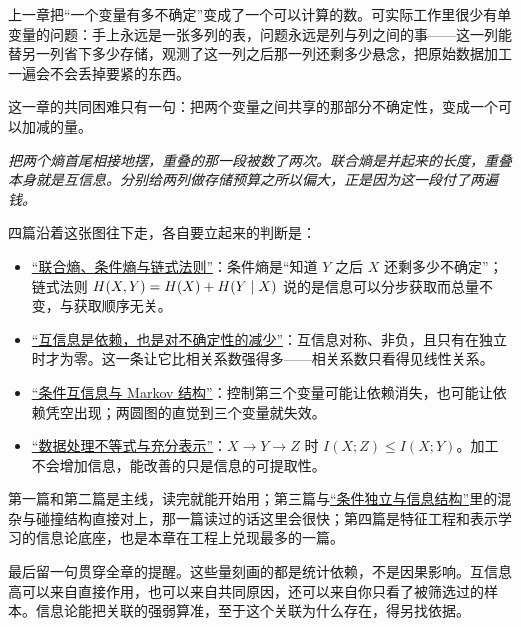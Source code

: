 上一章把``一个变量有多不确定''变成了一个可以计算的数。可实际工作里很少有单变量的问题：手上永远是一张多列的表，问题永远是列与列之间的事——这一列能替另一列省下多少存储，观测了这一列之后那一列还剩多少悬念，把原始数据加工一遍会不会丢掉要紧的东西。

这一章的共同困难只有一句：把两个变量之间共享的那部分不确定性，变成一个可以加减的量。

\begin{center}

\emph{把两个熵首尾相接地摆，重叠的那一段被数了两次。联合熵是并起来的长度，重叠本身就是互信息。分别给两列做存储预算之所以偏大，正是因为这一段付了两遍钱。}
\end{center}

四篇沿着这张图往下走，各自要立起来的判断是：

\begin{itemize}
\tightlist
\item \hyperref[sec:07-Information-Theory/02-Joint-Information/01]{``联合熵、条件熵与链式法则''}：条件熵是``知道 \(Y\) 之后 \(X\) 还剩多少不确定''；链式法则 \(H(X,Y)=H(X)+H(Y\mid X)\) 说的是信息可以分步获取而总量不变，与获取顺序无关。
\item \hyperref[sec:07-Information-Theory/02-Joint-Information/02]{``互信息是依赖，也是对不确定性的减少''}：互信息对称、非负，且只有在独立时才为零。这一条让它比相关系数强得多——相关系数只看得见线性关系。
\item \hyperref[sec:07-Information-Theory/02-Joint-Information/03]{``条件互信息与 Markov 结构''}：控制第三个变量可能让依赖消失，也可能让依赖凭空出现；两圆图的直觉到三个变量就失效。
\item \hyperref[sec:07-Information-Theory/02-Joint-Information/04]{``数据处理不等式与充分表示''}：\(X\to Y\to Z\) 时 \(I(X;Z)\le I(X;Y)\)。加工不会增加信息，能改善的只是信息的可提取性。
\end{itemize}

第一篇和第二篇是主线，读完就能开始用；第三篇与\hyperref[sec:05-Probability/02-Conditional-Probability/04]{``条件独立与信息结构''}里的混杂与碰撞结构直接对上，那一篇读过的话这里会很快；第四篇是特征工程和表示学习的信息论底座，也是本章在工程上兑现最多的一篇。

最后留一句贯穿全章的提醒。这些量刻画的都是统计依赖，不是因果影响。互信息高可以来自直接作用，也可以来自共同原因，还可以来自你只看了被筛选过的样本。信息论能把关联的强弱算准，至于这个关联为什么存在，得另找依据。
